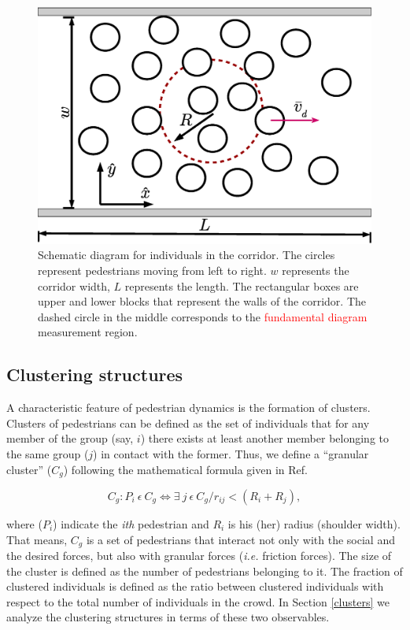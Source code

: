 \documentclass[preprint,12pt]{elsarticle}
\begin{document}
\begin{figure}[htbp!]
\centering
\includegraphics[width=0.7\columnwidth]
{./corridor.eps}
\caption{\label{corridor} Schematic diagram for individuals in the corridor. 
The circles represent pedestrians moving from left to right. $w$ represents the 
corridor width, $L$ represents the length. The rectangular boxes are upper and 
lower blocks that represent the walls of the corridor. The dashed circle in the 
middle corresponds to the \textcolor{red}{fundamental diagram} measurement region.}
\end{figure}

\subsection{\label{granular-cluster} Clustering structures}

A characteristic feature of pedestrian dynamics is the formation of clusters. Clusters of pedestrians can 
be defined as the set of individuals that for any member of the group (say, $i$) there exists at least another member belonging to the same group ($j$) in contact with the former. Thus, we define a ``granular cluster'' ($C_g$) following the mathematical formula given in Ref.~\cite{Dorso1}

\begin{equation}
C_g:P_i~\epsilon~ C_g \Leftrightarrow \exists~ j~\epsilon~C_g / r_{ij} < (R_i+R_j), \label{ec-cluster}
\end{equation}

where ($P_i$) indicate the \textit{ith} pedestrian and $R_i$ is his (her) radius 
(shoulder width). That means, $C_g$ is a set of pedestrians that interact not 
only with the social and the desired forces, but also with granular forces 
(\textit{i.e.} friction forces). The size of the cluster is defined as the 
number of pedestrians belonging to it. The fraction of clustered individuals is 
defined as the ratio between clustered individuals with respect to the total 
number of individuals in the crowd. In Section \ref{clusters} we analyze the 
clustering structures in terms of these two observables. \\
\end{document}
